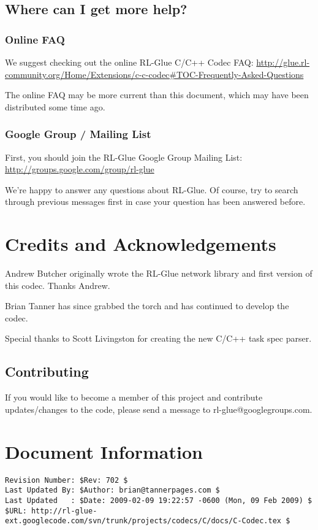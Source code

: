 \documentclass[11pt]{article}
\begin{document}
\subsection{Where can I get more help?}
\subsubsection{Online FAQ}
We suggest checking out the online RL-Glue C/C++ Codec FAQ:\newline
\url{http://glue.rl-community.org/Home/Extensions/c-c-codec#TOC-Frequently-Asked-Questions}

The online FAQ may be more current than this document, which may have been distributed some time ago.

\subsubsection{Google Group / Mailing List}
First, you should join the RL-Glue Google Group Mailing List:\newline
\url{http://groups.google.com/group/rl-glue}

We're happy to answer any questions about RL-Glue.  Of course, try to search through previous messages first in case your question has been answered before.


\section{Credits and Acknowledgements}
Andrew Butcher originally wrote the RL-Glue network library and first version of this codec.  Thanks Andrew.

Brian Tanner has since grabbed the torch and has continued to develop the codec.

Special thanks to Scott Livingston for creating the new C/C++ task spec parser.

\subsection{Contributing}
If you would like to become a member of this project and contribute updates/changes to the code, please send a message to rl-glue@googlegroups.com.


\section*{Document Information}
\begin{verbatim}
Revision Number: $Rev: 702 $
Last Updated By: $Author: brian@tannerpages.com $
Last Updated   : $Date: 2009-02-09 19:22:57 -0600 (Mon, 09 Feb 2009) $
$URL: http://rl-glue-ext.googlecode.com/svn/trunk/projects/codecs/C/docs/C-Codec.tex $
\end{verbatim}
\end{document}
